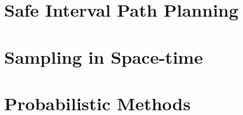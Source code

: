 \section{Safe Interval Path Planning}

\section{Sampling in Space-time}

\section{Probabilistic Methods}


